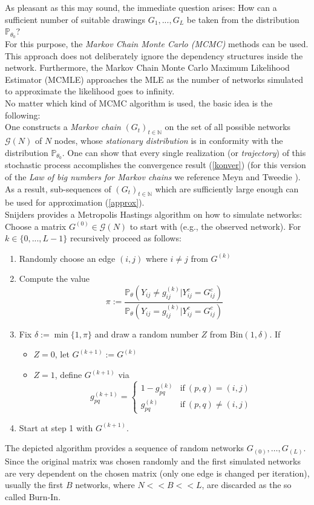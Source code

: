 \documentclass[10pt, conference, compsocconf]{IEEEtran}
\begin{document}
As pleasant as this may sound, the immediate question arises: How can a sufficient number of suitable drawings $G_1,...,G_L$ be taken from the distribution $\mathbb{P}_{\theta_0}$? \\
For this purpose, the \textit{Markov Chain Monte Carlo (MCMC)} methods can be used. This approach does not deliberately ignore the dependency structures inside the network. Furthermore, the Markov Chain Monte Carlo Maximum Likelihood Estimator (MCMLE) approaches the MLE as the number of networks simulated to approximate the likelihood goes to infinity.\\[0.3cm]
No matter which kind of MCMC algorithm is used, the basic idea is the following:
\\One constructs a \textit{Markov chain} $(G_t)_{t \in \mathbb{N}}$ on the set of all possible networks $\mathcal{G}(N)$ of $N$ nodes, whose \textit{stationary distribution} is in conformity with the distribution $\mathbb{P}_{\theta_0}$. One can show that every single realization (or \textit{trajectory}) 
of this stochastic process accomplishes the convergence result (\ref{konver}) (for this version of the \textit{Law of big numbers for Markov chains} we reference Meyn and Tweedie \cite{Meyn.2009}). As a result, sub-sequences of $(G_t)_{t \in \mathbb{N}}$ which are sufficiently large enough can be used for approximation (\ref{approx}).\\[0.3cm]
Snijders \cite{Snijders.2002} provides a Metropolis Hastings algorithm on how to simulate networks:
Choose a matrix $G^{(0)} \in \mathcal{G}(N)$ to start with (e.g., the observed network). For $k \in \{0,...,L-1\}$ recursively proceed as follows:\\
\begin{enumerate}
\item Randomly choose an edge $(i,j)$ where $i \neq j$ from $G^{(k)}$
\item Compute the value
$$\pi := \dfrac{\mathbb{P}_{\theta}(Y_{ij} \neq g_{ij}^{(k)} | Y_{ij}^c=G_{ij}^c)}{\mathbb{P}_{\theta}(Y_{ij}= g_{ij}^{(k)} | Y_{ij}^c=G_{ij}^c)}$$
\item Fix $\delta:= \min\{1, \pi\}$ and draw a random number $Z$ from Bin$(1, \delta)$. If
\begin{itemize}
\item $Z=0$, let $G^{(k+1)} := G^{(k)}$ 
\item $Z=1$, define $G^{(k+1)}$ via
$$g_{pq}^{(k+1)}=\begin{cases}
1-g_{pq}^{(k)}& \text{if}~ (p,q)=(i,j) \\
g_{pq}^{(k)} &\text{if}~ (p,q) \neq (i,j) 
\end{cases}$$
\end{itemize}
\item Start at step 1 with $G^{(k+1)}$.
\end{enumerate}
\vspace{0.3cm}
\noindent The depicted algorithm provides a sequence of random networks $G_(0),\dots,G_(L)$. Since the original matrix was chosen randomly and the first simulated networks are very dependent on the chosen matrix (only one edge is changed per iteration), usually
the first $B$ networks, where $N << B << L$, are discarded as the so called Burn-In.
\end{document}
